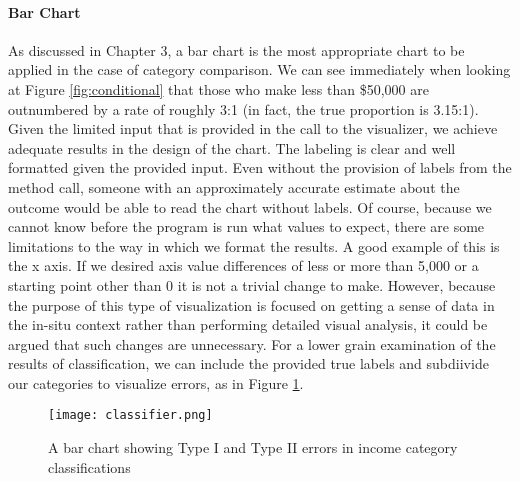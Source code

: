 \paragraph{Bar Chart}
As discussed in Chapter 3, a bar chart is the most appropriate chart to be applied in the case of category comparison. We can see immediately when looking at Figure \ref{fig:conditional} that those who make less than \$50,000 are outnumbered by a rate of roughly 3:1 (in fact, the true proportion is 3.15:1). Given the limited input that is provided in the call to the visualizer, we achieve adequate results in the design of the chart. The labeling is clear and well formatted given the provided input. Even without the provision of labels from the method call, someone with an approximately accurate estimate about the outcome would be able to read the chart without labels. Of course, because we cannot know before the  program is run what values to expect, there are some limitations to the way in which we format the results. A good example of this is the x axis. If we desired axis value differences of less or more than 5,000 or a starting point other than 0 it is not a trivial change to make. However, because the purpose of this type of visualization is focused on getting a sense of data in the in-situ context rather than performing detailed visual analysis, it could be argued that such changes are unnecessary. For a lower grain examination of the results of classification, we can include the provided true labels and subdiivide our categories to visualize errors, as in Figure \ref{fig:errors}.

\begin{figure}
	\centering
	\texttt{[image: classifier.png]}
	\caption{A bar chart showing Type I and Type II errors in income category classifications}
	\label{fig:errors}
\end{figure}

